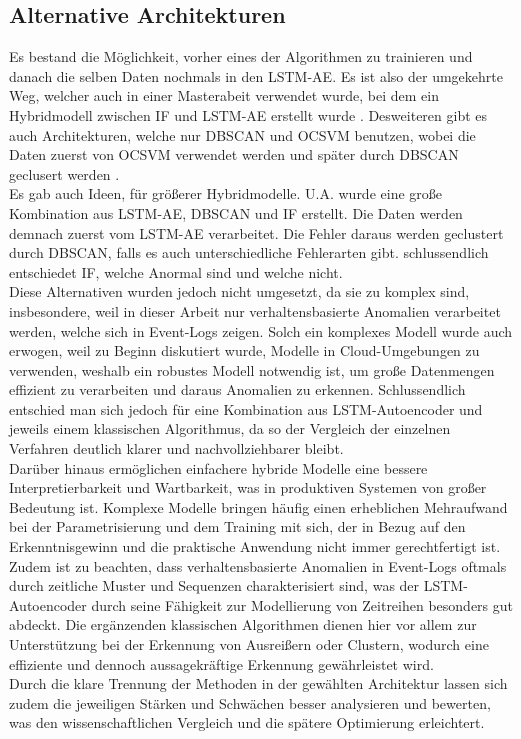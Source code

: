 \documentclass[a4paper,12pt]{article}
\begin{document}
	\subsection{Alternative Architekturen}
	Es bestand die Möglichkeit, vorher eines der Algorithmen zu trainieren und danach die selben Daten nochmals in den LSTM-AE. Es ist also der umgekehrte Weg, welcher auch in einer Masterabeit verwendet wurde, bei dem ein Hybridmodell zwischen IF und LSTM-AE erstellt wurde \cite{hybrid_if_lstm2023}.
	Desweiteren gibt es auch Architekturen, welche nur DBSCAN und OCSVM benutzen, wobei die Daten zuerst von OCSVM verwendet werden und später durch DBSCAN geclusert werden \cite{pu2021hybrid}.
	\\[0.5em]
	Es gab auch Ideen, für größerer Hybridmodelle. U.A. wurde eine große Kombination aus LSTM-AE, DBSCAN und IF erstellt. Die Daten werden demnach zuerst vom LSTM-AE verarbeitet. Die Fehler daraus werden geclustert durch DBSCAN, falls es auch unterschiedliche Fehlerarten gibt. schlussendlich entschiedet IF, welche Anormal sind und welche nicht.
	\\[0.5em]
	Diese Alternativen wurden jedoch nicht umgesetzt, da sie zu komplex sind, insbesondere, weil in dieser Arbeit nur verhaltensbasierte Anomalien verarbeitet werden, welche sich in Event-Logs zeigen. Solch ein komplexes Modell wurde auch erwogen, weil zu Beginn diskutiert wurde, Modelle in Cloud-Umgebungen zu verwenden, weshalb ein robustes Modell notwendig ist, um große Datenmengen effizient zu verarbeiten und daraus Anomalien zu erkennen. Schlussendlich entschied man sich jedoch für eine Kombination aus LSTM-Autoencoder und jeweils einem klassischen Algorithmus, da so der Vergleich der einzelnen Verfahren deutlich klarer und nachvollziehbarer bleibt.
	\\[0.5em]
	Darüber hinaus ermöglichen einfachere hybride Modelle eine bessere Interpretierbarkeit und Wartbarkeit, was in produktiven Systemen von großer Bedeutung ist. Komplexe Modelle bringen häufig einen erheblichen Mehraufwand bei der Parametrisierung und dem Training mit sich, der in Bezug auf den Erkenntnisgewinn und die praktische Anwendung nicht immer gerechtfertigt ist.
	\\[0.5em]
	Zudem ist zu beachten, dass verhaltensbasierte Anomalien in Event-Logs oftmals durch zeitliche Muster und Sequenzen charakterisiert sind, was der LSTM-Autoencoder durch seine Fähigkeit zur Modellierung von Zeitreihen besonders gut abdeckt. Die ergänzenden klassischen Algorithmen dienen hier vor allem zur Unterstützung bei der Erkennung von Ausreißern oder Clustern, wodurch eine effiziente und dennoch aussagekräftige Erkennung gewährleistet wird.
	\\[0.5em]
	Durch die klare Trennung der Methoden in der gewählten Architektur lassen sich zudem die jeweiligen Stärken und Schwächen besser analysieren und bewerten, was den wissenschaftlichen Vergleich und die spätere Optimierung erleichtert.
	
\end{document}
